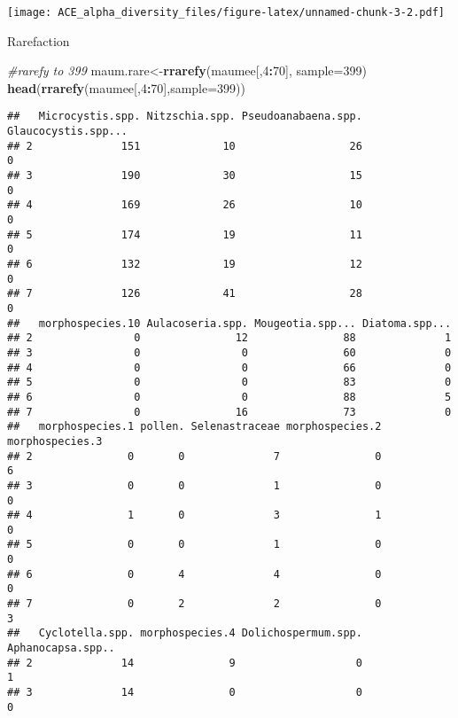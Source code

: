\documentclass[]{article}
\newenvironment{Shaded}{\begin{snugshade}}{\end{snugshade}}
\newcommand{\KeywordTok}[1]{\textcolor[rgb]{0.13,0.29,0.53}{\textbf{#1}}}
\newcommand{\DataTypeTok}[1]{\textcolor[rgb]{0.13,0.29,0.53}{#1}}
\newcommand{\DecValTok}[1]{\textcolor[rgb]{0.00,0.00,0.81}{#1}}
\newcommand{\CommentTok}[1]{\textcolor[rgb]{0.56,0.35,0.01}{\textit{#1}}}
\newcommand{\OperatorTok}[1]{\textcolor[rgb]{0.81,0.36,0.00}{\textbf{#1}}}
\newcommand{\NormalTok}[1]{#1}
\begin{document}
\texttt{[image: ACE\_alpha\_diversity\_files/figure-latex/unnamed-chunk-3-2.pdf]}

Rarefaction

\begin{Shaded}
\begin{Highlighting}[]
\CommentTok{#rarefy to 399}
\NormalTok{maum.rare<-}\KeywordTok{rrarefy}\NormalTok{(maumee[,}\DecValTok{4}\OperatorTok{:}\DecValTok{70}\NormalTok{], }\DataTypeTok{sample=}\DecValTok{399}\NormalTok{)}
\KeywordTok{head}\NormalTok{(}\KeywordTok{rrarefy}\NormalTok{(maumee[,}\DecValTok{4}\OperatorTok{:}\DecValTok{70}\NormalTok{],}\DataTypeTok{sample=}\DecValTok{399}\NormalTok{))}
\end{Highlighting}
\end{Shaded}

\begin{verbatim}
##   Microcystis.spp. Nitzschia.spp. Pseudoanabaena.spp. Glaucocystis.spp...
## 2              151             10                  26                   0
## 3              190             30                  15                   0
## 4              169             26                  10                   0
## 5              174             19                  11                   0
## 6              132             19                  12                   0
## 7              126             41                  28                   0
##   morphospecies.10 Aulacoseria.spp. Mougeotia.spp... Diatoma.spp...
## 2                0               12               88              1
## 3                0                0               60              0
## 4                0                0               66              0
## 5                0                0               83              0
## 6                0                0               88              5
## 7                0               16               73              0
##   morphospecies.1 pollen. Selenastraceae morphospecies.2 morphospecies.3
## 2               0       0              7               0               6
## 3               0       0              1               0               0
## 4               1       0              3               1               0
## 5               0       0              1               0               0
## 6               0       4              4               0               0
## 7               0       2              2               0               3
##   Cyclotella.spp. morphospecies.4 Dolichospermum.spp. Aphanocapsa.spp..
## 2              14               9                   0                 1
## 3              14               0                   0                 0

\end{verbatim}
\end{document}
